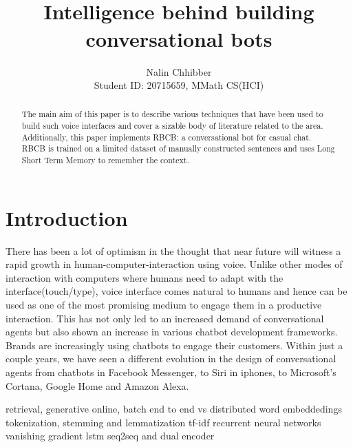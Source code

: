 \documentclass[letterpaper] {article} %
\begin{document}
%
\title{ \\Intelligence behind building conversational bots}
\author{Nalin Chhibber\\ Student ID: 20715659, MMath CS(HCI)\\
}
\maketitle
\begin{abstract}
The main aim of this paper is to describe various techniques that have been used to build such voice interfaces and cover a sizable body of literature related to the area. Additionally, this paper implements RBCB: a conversational bot for casual chat. RBCB is trained on a limited dataset of manually constructed sentences and uses Long Short Term Memory to remember the context. 

\end{abstract}

\section{Introduction}
There has been a lot of optimism in the thought that near future will witness a rapid growth in human-computer-interaction using voice. Unlike other modes of interaction with computers where humans need to adapt with the interface(touch/type), voice interface comes natural to humans and hence can be used as one of the most promising medium to engage them in a productive interaction. This has not only led to an increased demand of conversational agents but also shown an increase in various chatbot development frameworks. Brands are increasingly using chatbots to engage their customers. Within just a couple years, we have seen a different evolution in the design of conversational agents from chatbots in Facebook Messenger, to Siri in iphones, to Microsoft's Cortana, Google Home and Amazon Alexa. 



retrieval, generative
online, batch
end to end vs distributed
word embeddedings
tokenization, stemming and lemmatization
tf-idf
recurrent neural networks
vanishing gradient
lstm
seq2seq and dual encoder 
\end{document}
